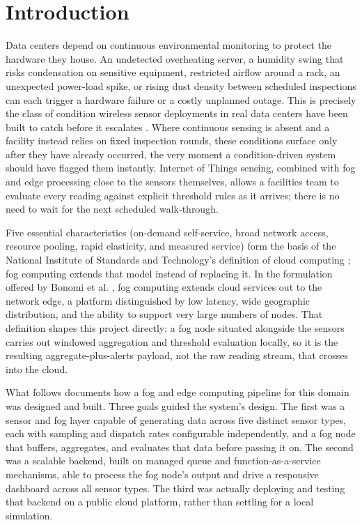 \documentclass[conference]{IEEEtran}
\begin{document}
\section{Introduction}
Data centers depend on continuous environmental monitoring to protect the hardware they house. An undetected overheating server, a humidity swing that risks condensation on sensitive equipment, restricted airflow around a rack, an unexpected power-load spike, or rising dust density between scheduled inspections can each trigger a hardware failure or a costly unplanned outage. This is precisely the class of condition wireless sensor deployments in real data centers have been built to catch before it escalates \cite{ref1,ref2}. Where continuous sensing is absent and a facility instead relies on fixed inspection rounds, these conditions surface only after they have already occurred, the very moment a condition-driven system should have flagged them instantly. Internet of Things sensing, combined with fog and edge processing close to the sensors themselves, allows a facilities team to evaluate every reading against explicit threshold rules as it arrives; there is no need to wait for the next scheduled walk-through.

Five essential characteristics (on-demand self-service, broad network access, resource pooling, rapid elasticity, and measured service) form the basis of the National Institute of Standards and Technology's definition of cloud computing \cite{ref3}; fog computing extends that model instead of replacing it. In the formulation offered by Bonomi et al. \cite{ref4}, fog computing extends cloud services out to the network edge, a platform distinguished by low latency, wide geographic distribution, and the ability to support very large numbers of nodes. That definition shapes this project directly: a fog node situated alongside the sensors carries out windowed aggregation and threshold evaluation locally, so it is the resulting aggregate-plus-alerts payload, not the raw reading stream, that crosses into the cloud.

What follows documents how a fog and edge computing pipeline for this domain was designed and built. Three goals guided the system's design. The first was a sensor and fog layer capable of generating data across five distinct sensor types, each with sampling and dispatch rates configurable independently, and a fog node that buffers, aggregates, and evaluates that data before passing it on. The second was a scalable backend, built on managed queue and function-as-a-service mechanisms, able to process the fog node's output and drive a responsive dashboard across all sensor types. The third was actually deploying and testing that backend on a public cloud platform, rather than settling for a local simulation.
\end{document}
